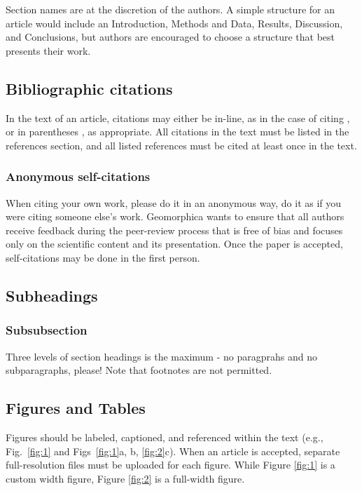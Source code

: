 \documentclass[breakmath, anonymous]{geomorphica}
\begin{document}
Section names are at the discretion of the authors. A simple structure for an article would include an Introduction, Methods and Data, Results, Discussion, and Conclusions, but authors are encouraged to choose a structure that best presents their work.
	
\subsection{Bibliographic citations}
In the text of an article, citations may either be in-line, as in the case of citing \citet{metropolis_monte_1949}, or in parentheses \citep[e.g.,][]{metropolis_monte_1949}, as appropriate. All citations in the text must be listed in the references section, and all listed references must be cited at least once in the text.
\subsubsection{Anonymous self-citations}
When citing your own work, please do it in an anonymous way, do it as if you were citing someone else’s work. Geomorphica wants to ensure that all authors receive feedback during the peer-review process that is free of bias and focuses only on the scientific content and its presentation. Once the paper is accepted, self-citations may be done in the first person.

\subsection{Subheadings}
\subsubsection{Subsubsection}
Three levels of section headings is the maximum - no paragprahs and no subparagraphs, please! Note that footnotes are not permitted.
	
\subsection{Figures and Tables}
Figures should be labeled, captioned, and referenced within the text (e.g., Fig.~\ref{fig:1} and Figs~\ref{fig:1}a, b, \ref{fig:2}c). When an article is accepted, separate full-resolution files must be uploaded for each figure. While Figure \ref{fig:1} is a custom width figure, Figure \ref{fig:2} is a full-width figure.
	 
\end{document}
